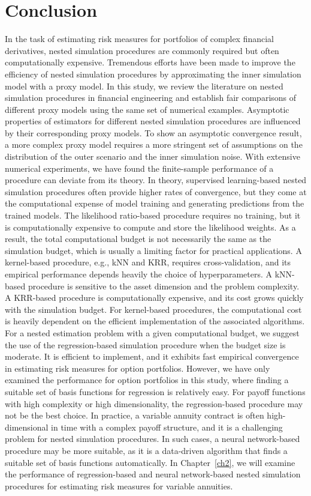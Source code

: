 \section{Conclusion} \label{sec1:conclusion}
In the task of estimating risk measures for portfolios of complex financial derivatives, nested simulation procedures are commonly required but often computationally expensive. 
Tremendous efforts have been made to improve the efficiency of nested simulation procedures by approximating the inner simulation model with a proxy model. 
In this study, we review the literature on nested simulation procedures in financial engineering and establish fair comparisons of different proxy models using the same set of numerical examples. 
Asymptotic properties of estimators for different nested simulation procedures are influenced by their corresponding proxy models.
To show an asymptotic convergence result, a more complex proxy model requires a more stringent set of assumptions on the distribution of the outer scenario and the inner simulation noise.
With extensive numerical experiments, we have found the finite-sample performance of a procedure can deviate from its theory. 
In theory, supervised learning-based nested simulation procedures often provide higher rates of convergence, but they come at the computational expense of model training and generating predictions from the trained models. 
The likelihood ratio-based procedure requires no training, but it is computationally expensive to compute and store the likelihood weights.
As a result, the total computational budget is not necessarily the same as the simulation budget, which is usually a limiting factor for practical applications.
A kernel-based procedure, e.g., kNN and KRR, requires cross-validation, and its empirical performance depends heavily the choice of hyperparameters.
A kNN-based procedure is sensitive to the asset dimension and the problem complexity.
A KRR-based procedure is computationally expensive, and its cost grows quickly with the simulation budget.
For kernel-based procedures, the computational cost is heavily dependent on the efficient implementation of the associated algorithms.
For a nested estimation problem with a given computational budget, we suggest the use of the regression-based simulation procedure when the budget size is moderate. 
It is efficient to implement, and it exhibits fast empirical convergence in estimating risk measures for option portfolios. 
However, we have only examined the performance for option portfolios in this study, where finding a suitable set of basis functions for regression is relatively easy.
For payoff functions with high complexity or high dimensionality, the regression-based procedure may not be the best choice.
In practice, a variable annuity contract is often high-dimensional in time with a complex payoff structure, and it is a challenging problem for nested simulation procedures.
In such cases, a neural network-based procedure may be more suitable, as it is a data-driven algorithm that finds a suitable set of basis functions automatically.
In Chapter~\ref{ch2}, we will examine the performance of regression-based and neural network-based nested simulation procedures for estimating risk measures for variable annuities.
